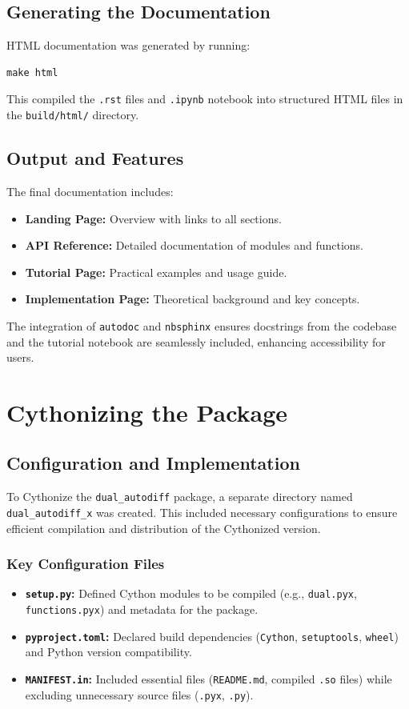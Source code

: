\documentclass[a4paper,12pt]{article}
\begin{document}
\subsection{Generating the Documentation}
HTML documentation was generated by running:
\begin{verbatim}
make html
\end{verbatim}
This compiled the \texttt{.rst} files and \texttt{.ipynb} notebook into structured HTML files in the \texttt{build/html/} directory.

\subsection{Output and Features}
The final documentation includes:
\begin{itemize}
    \item \textbf{Landing Page:} Overview with links to all sections.
    \item \textbf{API Reference:} Detailed documentation of modules and functions.
    \item \textbf{Tutorial Page:} Practical examples and usage guide.
    \item \textbf{Implementation Page:} Theoretical background and key concepts.
\end{itemize}
The integration of \texttt{autodoc} and \texttt{nbsphinx} ensures docstrings from the codebase and the tutorial notebook are seamlessly included, enhancing accessibility for users.


\section{Cythonizing the Package}

\subsection{Configuration and Implementation}
To Cythonize the \texttt{dual\_autodiff} package, a separate directory named \texttt{dual\_autodiff\_x} was created. This included necessary configurations to ensure efficient compilation and distribution of the Cythonized version.

\subsubsection{Key Configuration Files}
\begin{itemize}
    \item \textbf{\texttt{setup.py}:} Defined Cython modules to be compiled (e.g., \texttt{dual.pyx}, \texttt{functions.pyx}) and metadata for the package.
    \item \textbf{\texttt{pyproject.toml}:} Declared build dependencies (\texttt{Cython}, \texttt{setuptools}, \texttt{wheel}) and Python version compatibility.
    \item \textbf{\texttt{MANIFEST.in}:} Included essential files (\texttt{README.md}, compiled \texttt{.so} files) while excluding unnecessary source files (\texttt{.pyx}, \texttt{.py}).
\end{itemize}
\end{document}
